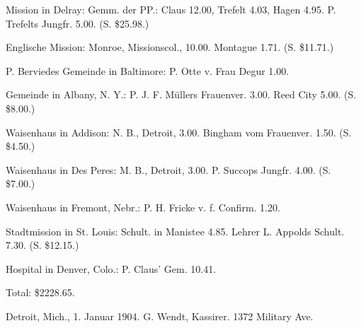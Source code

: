 Mission in Delray: Gemm. der PP.: Claus 12.00, Trefelt 4.03, Hagen 4.95. P. Trefelts Jungfr. 5.00. (S. \$25.98.)

Englische Mission: Monroe, Missionscol., 10.00. Montague 1.71. (S. \$11.71.)

P. Berviedes Gemeinde in Baltimore: P. Otte v. Frau Degur 1.00.

Gemeinde in Albany, N. Y.: P. J. F. Müllers Frauenver. 3.00. Reed City 5.00. (S. \$8.00.)

Waisenhaus in Addison: N. B., Detroit, 3.00. Bingham vom Frauenver. 1.50. (S. \$4.50.)

Waisenhaus in Des Peres: M. B., Detroit, 3.00. P. Succops Jungfr. 4.00. (S. \$7.00.)

Waisenhaus in Fremont, Nebr.: P. H. Fricke v. f. Confirm. 1.20.

Stadtmission in St. Louis: Schult. in Manistee 4.85. Lehrer L. Appolds Schult. 7.30. (S. \$12.15.)

Hospital in Denver, Colo.: P. Claus’ Gem. 10.41.

Total: \$2228.65.

Detroit, Mich., 1. Januar 1904. G. Wendt, Kassirer. 1372 Military Ave.
